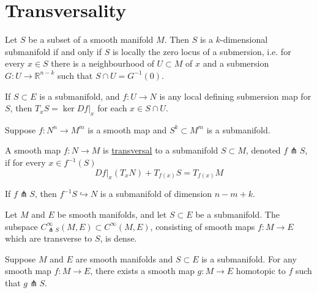 \chapter{Transversality} 
\label{appendix4}

\begin{thm}
	Let $S$ be a subset of a smooth manifold $M$. Then $S$ is a  $k$-dimensional
	submanifold if and only if  $S$ is locally the zero locus of a submersion,
	i.e. for every  $x\in S$ there is a neighbourhood of $U\subset M$ of $x$ and
	a submersion  $G : U \to \mathbb{R}^{n-k}$ such that $S\cap U = G^{-1}(0)$.
\end{thm}

\begin{thm}
	If $S \subset E$ is a submanifold, and $f: U \to N$ is any local defining
	submersion map for $S$, then $T_xS = \ker Df|_x$ for each $x\in S\cap U$.
\end{thm}
\noindent
Suppose $f : N^n \to M^m$ is a smooth map and  $S^k \subset M^m$ is a submanifold.
\begin{defn}
	A smooth map $f: N\to M$ is \underline{transversal} to a submanifold
	$S\subset M$, denoted $f \pitchfork S$, if for every $x\in f^{-1}(S)$ 
	\[
	Df|_x(T_xN) + T_{f(x)}S = T_{f(x)}M
	\] 
\end{defn}

\begin{thm} \label{thm:inverse_submanifold}
	 If $f \pitchfork S$, then  $f^{-1}S \hookrightarrow N$ is a 
	submanifold of dimension $n-m+k$.
\end{thm}

\begin{thm}
	Let $M$ and $E$ be smooth manifolds, and let  $S\subset E$ be a submanifold. 
	The subspace $C^{\infty}_{\pitchfork S}(M,E) \subset C^{\infty}(M,E)$,
	consisting of smooth maps $f:M\to E$ which are transverse to  $S$, is dense.
\end{thm}
\begin{comment}
	This is equivalent to the following. For any smooth map $f: M\to E$ there
	exists a smooth embedding  $s:S\to E$ arbitrarily close to  $i:S\to E$, and
	for which  $f$ is transverse to  $s$. 
\end{comment}

\begin{thm}
	Suppose $M$ and  $E$ are smooth manifolds and  $S \subset E$ is a
	submanifold.
	For any smooth map $f: M\to E$, there exists a smooth map $g: M\to E$
	homotopic to  $f$ such that $g \pitchfork S$.
\end{thm}
